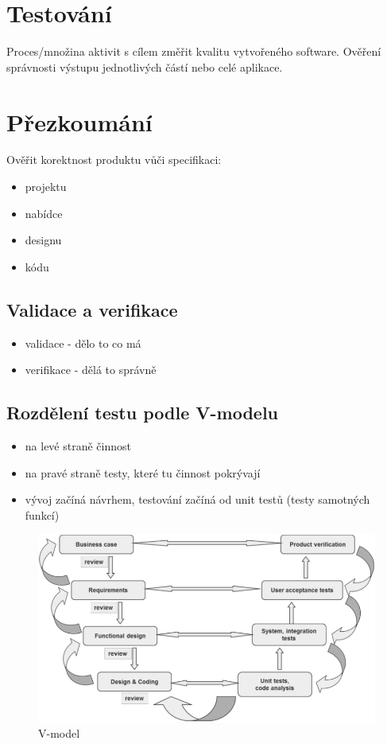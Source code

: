 \documentclass{szzclass}
\begin{document}
\tableofcontents
\newpage

\section{Testování}
Proces/množina aktivit s cílem změřit kvalitu vytvořeného software. Ověření správnosti výstupu jednotlivých částí nebo celé aplikace.
\section{Přezkoumání}
Ověřit korektnost produktu vůči specifikaci:
\begin{itemize}
    \item projektu
    \item nabídce
    \item designu
    \item kódu
\end{itemize}

\subsection{Validace a verifikace}
\begin{itemize}
    \item validace - dělo to co má
    \item verifikace - dělá to správně
\end{itemize}
\subsection{Rozdělení testu podle V-modelu}
\begin{itemize}
    \item na levé straně činnost
    \item na pravé straně testy, které tu činnost pokrývají
    \item vývoj začíná návrhem, testování začíná od unit testů (testy samotných funkcí)
\end{itemize}
\begin{figure}[h!]
    \centering
    \includegraphics[width=1\textwidth]{topics/bi-wsi-si-22/images/vModel.png}
    \caption{V-model}
    \label{}
\end{figure}
\end{document}
